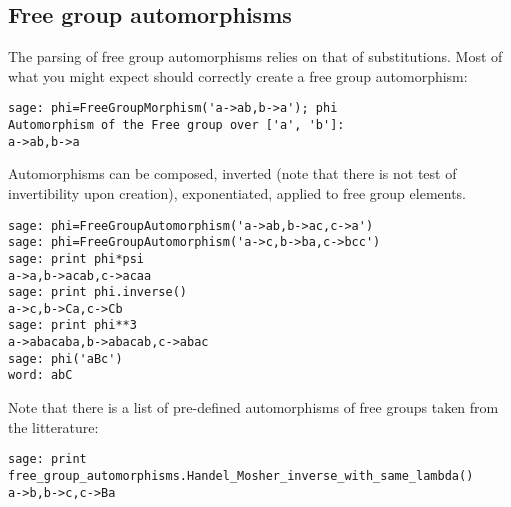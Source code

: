 \documentclass[10pt,a4paper]{article}
\begin{document}
\subsection{Free group automorphisms}

The parsing of free group automorphisms relies on that of
substitutions. Most of what you might expect should correctly create a
free group automorphism:
\begin{verbatim}
sage: phi=FreeGroupMorphism('a->ab,b->a'); phi
Automorphism of the Free group over ['a', 'b']:
a->ab,b->a
\end{verbatim}
Automorphisms can be composed, inverted (note that there is not test
of invertibility upon creation), exponentiated, applied to free group elements.
\begin{verbatim}
sage: phi=FreeGroupAutomorphism('a->ab,b->ac,c->a')
sage: phi=FreeGroupAutomorphism('a->c,b->ba,c->bcc')
sage: print phi*psi
a->a,b->acab,c->acaa
sage: print phi.inverse()
a->c,b->Ca,c->Cb
sage: print phi**3
a->abacaba,b->abacab,c->abac
sage: phi('aBc')
word: abC
\end{verbatim}

Note that there is a list of pre-defined automorphisms of free groups taken from the litterature:
\begin{verbatim}
sage: print free_group_automorphisms.Handel_Mosher_inverse_with_same_lambda()
a->b,b->c,c->Ba
\end{verbatim}
\end{document}
